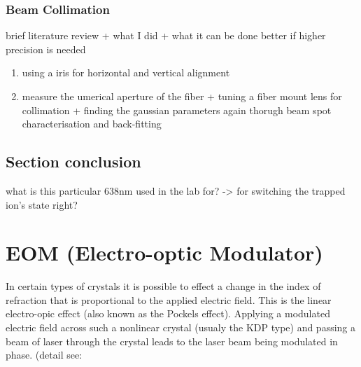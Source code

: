 \documentclass[11pt,A4Paper]{article}
\begin{document}
\subsubsection{Beam Collimation}
brief literature review + what I did + what it can be done better if higher precision is needed
\begin{enumerate}
    \item using a iris for horizontal and vertical alignment
    \item measure the umerical aperture of the fiber + tuning a fiber mount lens for collimation + finding the gaussian parameters again thorugh beam spot characterisation and back-fitting
\end{enumerate}




\subsection{Section conclusion}
what is this particular 638nm used in the lab for? -> for switching the trapped ion's state right? 


\section{EOM (Electro-optic Modulator)}
In certain types of crystals it is possible to effect a change in the index of refraction that is proportional to the applied electric field. This is the linear electro-opic effect (also known as the Pockels effect). Applying a modulated electric field across such a nonlinear crystal (usualy the KDP type) and passing a beam of laser through the crystal leads to the laser beam being modulated in phase. (detail see: \cite{fundamentalsOfPhotonics}
\end{document}

